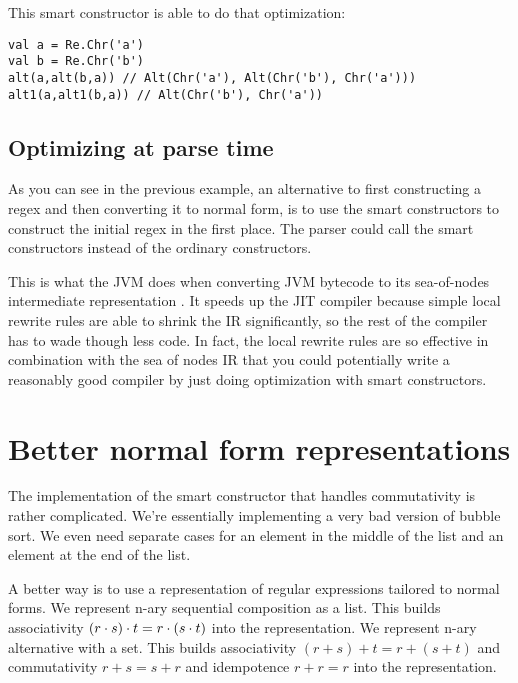 This smart constructor is able to do that optimization:

\begin{minipage}{\textwidth}\begin{lstlisting}
val a = Re.Chr('a')
val b = Re.Chr('b')
alt(a,alt(b,a)) // Alt(Chr('a'), Alt(Chr('b'), Chr('a')))
alt1(a,alt1(b,a)) // Alt(Chr('b'), Chr('a'))
\end{lstlisting}\end{minipage}

\subsection{Optimizing at parse time}

As you can see in the previous example, an alternative to first constructing a regex and then converting it to normal form, is to use the smart constructors to construct the initial regex in the first place. The parser could call the smart constructors instead of the ordinary constructors.

This is what the JVM does when converting JVM bytecode to its sea-of-nodes intermediate representation \cite{click95}. It speeds up the JIT compiler because simple local rewrite rules are able to shrink the IR significantly, so the rest of the compiler has to wade though less code. In fact, the local rewrite rules are so effective in combination with the sea of nodes IR that you could potentially write a reasonably good compiler by just doing optimization with smart constructors.


\section{Better normal form representations}

The implementation of the smart constructor that handles commutativity is rather complicated. We're essentially implementing a very bad version of bubble sort. We even need separate cases for an element in the middle of the list and an element at the end of the list.

A better way is to use a representation of regular expressions tailored to normal forms. We represent n-ary sequential composition as a list. This builds associativity $(r \cdot s) \cdot t = r \cdot (s \cdot t)$ into the representation. We represent n-ary alternative with a set. This builds associativity $(r + s) + t = r + (s + t)$ and commutativity $r + s = s + r$ and idempotence $r + r = r$ into the representation.

